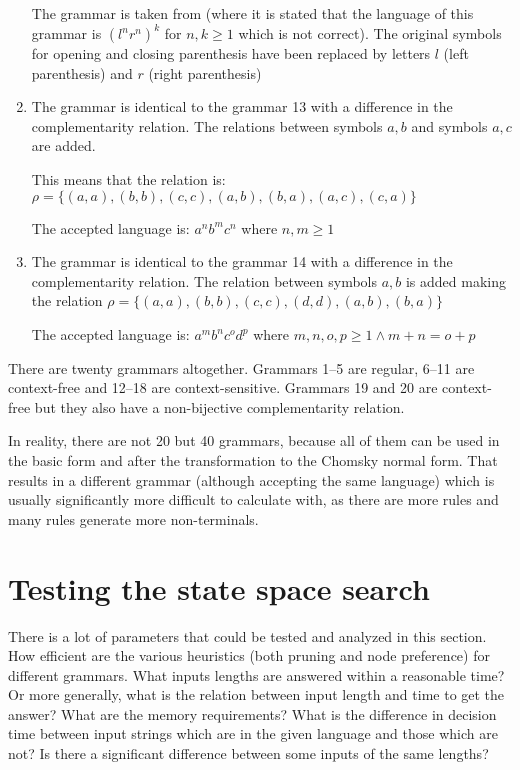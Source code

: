 \begin{enumerate}
{    The grammar is taken from \cite{WK_GRAMMARS_1} (where it is stated that the language of this grammar is $(l^nr^n)^k$ for $n, k \geq 1$ which is not correct). The original symbols for opening and closing parenthesis have been replaced by letters $l$ (left parenthesis) and $r$ (right parenthesis)
  }

  \item{
    The grammar is identical to the grammar 13 with a difference in the complementarity relation. The relations between symbols $a, b$ and symbols $a, c$ are added.

    This means that the relation is: $\rho = \{(a, a), (b, b), (c, c), (a, b), (b, a), (a, c), (c, a)\}$

    The accepted language is: $a^n b^m c^n$ where $n, m \geq 1$
  }

  \item{
	The grammar is identical to the grammar 14 with a difference in the complementarity relation. The relation between symbols $a, b$ is added making the relation $\rho = \{(a, a), (b, b), (c, c), (d, d), (a, b), (b, a)\}$

	The accepted language is: $a^m b^n c^o d^p$ where $m, n, o, p \geq 1 \wedge m+n = o+p$
  }


\end{enumerate}

There are twenty grammars altogether. Grammars 1--5 are regular, 6--11 are context-free and 12--18 are context-sensitive. Grammars 19 and 20 are context-free but they also have a non-bijective complementarity relation.

In reality, there are not 20 but 40 grammars, because all of them can be used in the basic form and after the transformation to the Chomsky normal form. That results in a different grammar (although accepting the same language) which is usually significantly more difficult to calculate with, as there are more rules and many rules generate more non-terminals.

\section{Testing the state space search}

There is a lot of parameters that could be tested and analyzed in this section. How efficient are the various heuristics (both pruning and node preference) for different grammars. What inputs lengths are answered within a reasonable time? Or more generally, what is the relation between input length and time to get the answer? What are the memory requirements? What is the difference in decision time between input strings which are in the given language and those which are not? Is there a significant difference between some inputs of the same lengths?

